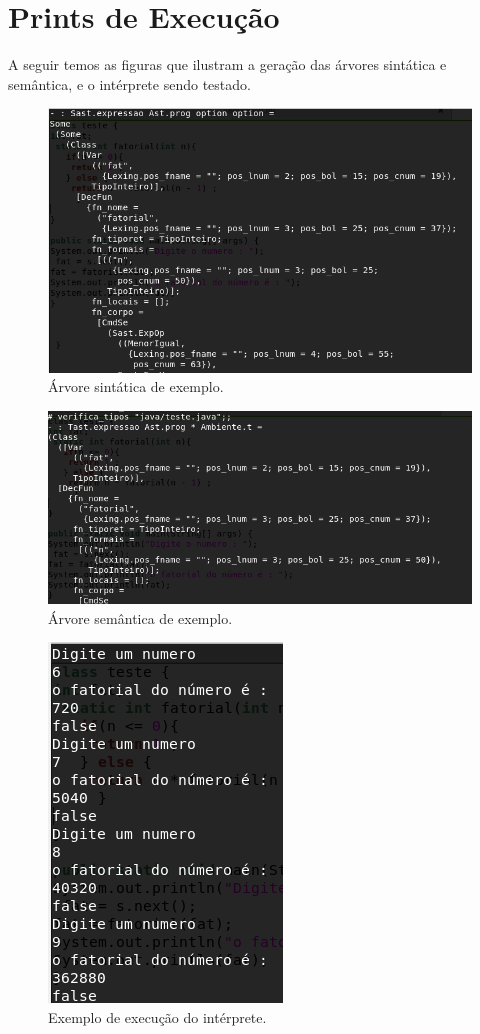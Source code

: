 \documentclass[12pt,a4paper,twoside]{report}
\begin{document}
\section{Prints de Execução}
A seguir temos as figuras que ilustram a geração das árvores sintática e semântica, e o intérprete sendo testado.
\begin{figure}[!ht]
\centering
\caption{Árvore sintática de exemplo.
      \label{fig:5}}
\includegraphics[scale=1]{imagens/printarvsintatica.png}
\end{figure}
\begin{figure}[!ht]
\centering
\caption{Árvore semântica de exemplo.
      \label{fig:6}}
\includegraphics[scale=1]{imagens/arvoretipada.png}
\end{figure}
\begin{figure}[!ht]
\centering
\caption{Exemplo de execução do intérprete.
      \label{fig:7}}
\includegraphics[scale=1]{imagens/interpreteteste.png}
\end{figure}
\clearpage
{}
\appendix
\end{document}
